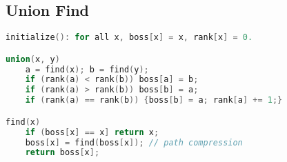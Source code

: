 \subsection{Union Find}
\begin{lstlisting}[language=C++]
initialize(): for all x, boss[x] = x, rank[x] = 0. 

union(x, y)
	a = find(x); b = find(y);
	if (rank(a) < rank(b)) boss[a] = b;
	if (rank(a) > rank(b)) boss[b] = a;
	if (rank(a) == rank(b)) {boss[b] = a; rank[a] += 1;}

find(x)
	if (boss[x] == x] return x;
	boss[x] = find(boss[x]); // path compression
	return boss[x];

\end{lstlisting}